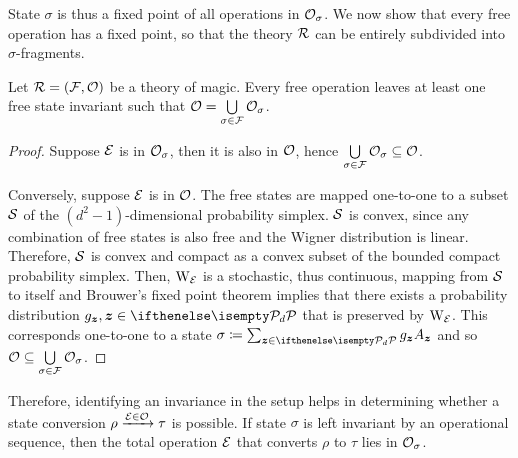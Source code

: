 State $\sigma$ is thus a fixed point of all operations in $\O_\sigma$. 
We now show that every free operation has a fixed point, so that the theory $\R$ can be entirely subdivided into $\sigma$-fragments.

\begin{theorem}
    Let $\R = (\F, \O)$ be a theory of magic.
    Every free operation leaves at least one free state invariant such that $\O = \bigcup\limits_{\sigma \in \F} \O_\sigma$.
\end{theorem}
\begin{proof}
    Suppose $\E$ is in $\O_\sigma$, then it is also in $\O$, hence $\bigcup\limits_{\sigma \in \F} \O_\sigma \subseteq \O$.
    
    Conversely, suppose $\E$ is in $\O$. 
    The free states are mapped one-to-one to a subset $\cal{S}$ of the $(d^2 - 1)$-dimensional probability simplex.
    $\cal{S}$ is convex, since any combination of free states is also free and the Wigner distribution is linear.
    Therefore, $\cal{S}$ is convex and compact as a convex subset of the bounded compact probability simplex. 
    Then, $\W{\E}{}$ is a stochastic, thus continuous, mapping from $\cal{S}$ to itself and Brouwer's fixed point theorem  implies that there exists a probability distribution $g_{\bmz}, \bmz \in \pd$ that is preserved by $\W{\E}{}$.
    This corresponds one-to-one to a state $\sigma \coloneqq \sum_{\bmz \in \pd} g_{\bmz} A_{\bmz}$ and so $\O \subseteq \bigcup\limits_{\sigma \in \F} \O_\sigma$.
\end{proof}
Therefore, identifying an invariance in the setup helps in determining whether a state conversion $\rho \xrightarrow{\E \in \O} \tau$ is possible. 
If state $\sigma$ is left invariant by an operational sequence, then the total operation $\E$ that converts $\rho$ to $\tau$ lies in $\O_\sigma$. 

